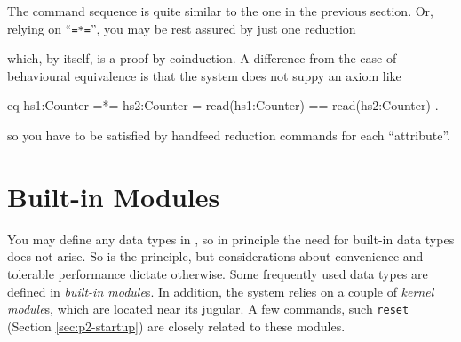 \documentclass[a4paper]{memoir}
\begin{document}
The command sequence is quite similar to the one in the previous section.
Or, relying on ``\verb|=*=|'', you may be rest assured by just one
reduction
\begin{vvtm}
\begin{ccode}
\end{ccode}
\end{vvtm}
which, by itself, is a proof by coinduction. A difference from the case of
behavioural equivalence is that the system does not suppy an
axiom like
\begin{vvtm}
\begin{ccode}
  eq hs1:Counter =*= hs2:Counter = read(hs1:Counter) == read(hs2:Counter) .
\end{ccode}
\end{vvtm}
so you have to be satisfied by handfeed reduction commands for each
``attribute''.

%

\chapter{Built-in Modules}\label{sec:p2-builtin-module}

You may define any data types in \cafeobj, so in principle the need for
built-in data types does not arise. So is the principle, but
considerations about
convenience and tolerable performance dictate otherwise. Some
frequently used data types are defined in {\em built-in module}s.
 In addition,
the system relies on a couple of {\em kernel module}s,
which are located near its jugular.
A few commands, such \verb|reset| (Section \ref{sec:p2-startup}) are
closely related to these modules.
\end{document}
